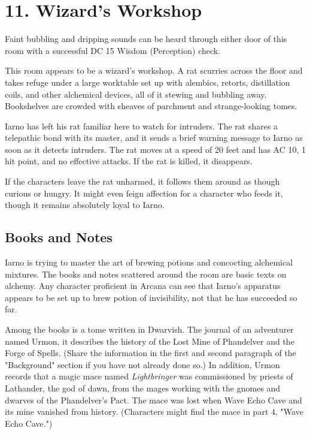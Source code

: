 \documentclass[10pt,a4paper,twoside,bg=print,twocolumn,openany,nodeprecatedcode]{dndbook}
\begin{document}
\section{11. Wizard's Workshop}
Faint bubbling and dripping sounds can be heard through either door of this room with a successful DC 15 Wisdom (Perception) check.

\begin{DndReadAloud}{}
This room appears to be a wizard's workshop. A rat scurries across the floor and takes refuge under a large worktable set up with alembics, retorts, distillation coils, and other alchemical devices, all of it stewing and bubbling away. Bookshelves are crowded with sheaves of parchment and strange-looking tomes.

\end{DndReadAloud}

Iarno has left his rat familiar here to watch for intruders. The rat shares a telepathic bond with its master, and it sends a brief warning message to Iarno as soon as it detects intruders. The rat moves at a speed of 20 feet and has AC 10, 1 hit point, and no effective attacks. If the rat is killed, it disappears.

If the characters leave the rat unharmed, it follows them around as though curious or hungry. It might even feign affection for a character who feeds it, though it remains absolutely loyal to Iarno.

\subsection{Books and Notes}
Iarno is trying to master the art of brewing potions and concocting alchemical mixtures. The books and notes scattered around the room are basic texts on alchemy. Any character proficient in Arcana can see that Iarno's apparatus appears to be set up to brew potion of invisibility, not that he has succeeded so far.

Among the books is a tome written in Dwarvish. The journal of an adventurer named Urmon, it describes the history of the Lost Mine of Phandelver and the Forge of Spells. (Share the information in the first and second paragraph of the "Background" section if you have not already done so.) In addition, Urmon records that a magic mace named \textit{Lightbringer} was commissioned by priests of Lathander, the god of dawn, from the mages working with the gnomes and dwarves of the Phandelver's Pact. The mace was lost when Wave Echo Cave and its mine vanished from history. (Characters might find the mace in part 4, "Wave Echo Cave.")
\end{document}
